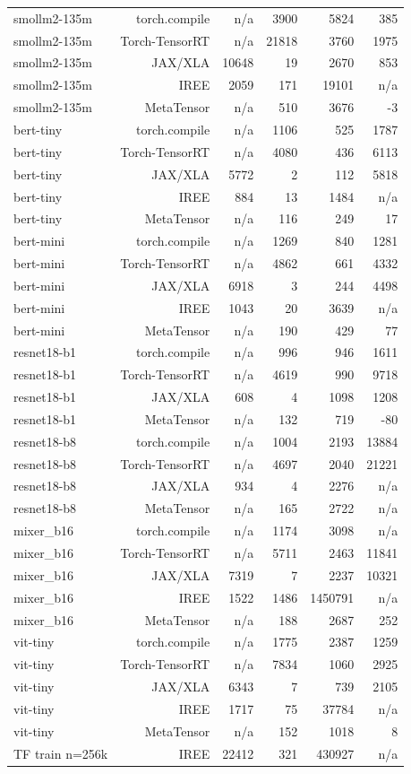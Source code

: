\begin{tabular}{lrrrrr}
smollm2-135m & torch.compile & n/a & 3900 & 5824 & 385 \\
smollm2-135m & Torch-TensorRT & n/a & 21818 & 3760 & 1975 \\
smollm2-135m & JAX/XLA & 10648 & 19 & 2670 & 853 \\
smollm2-135m & IREE & 2059 & 171 & 19101 & n/a \\
smollm2-135m & MetaTensor & n/a & 510 & 3676 & -3 \\
bert-tiny & torch.compile & n/a & 1106 & 525 & 1787 \\
bert-tiny & Torch-TensorRT & n/a & 4080 & 436 & 6113 \\
bert-tiny & JAX/XLA & 5772 & 2 & 112 & 5818 \\
bert-tiny & IREE & 884 & 13 & 1484 & n/a \\
bert-tiny & MetaTensor & n/a & 116 & 249 & 17 \\
bert-mini & torch.compile & n/a & 1269 & 840 & 1281 \\
bert-mini & Torch-TensorRT & n/a & 4862 & 661 & 4332 \\
bert-mini & JAX/XLA & 6918 & 3 & 244 & 4498 \\
bert-mini & IREE & 1043 & 20 & 3639 & n/a \\
bert-mini & MetaTensor & n/a & 190 & 429 & 77 \\
resnet18-b1 & torch.compile & n/a & 996 & 946 & 1611 \\
resnet18-b1 & Torch-TensorRT & n/a & 4619 & 990 & 9718 \\
resnet18-b1 & JAX/XLA & 608 & 4 & 1098 & 1208 \\
resnet18-b1 & MetaTensor & n/a & 132 & 719 & -80 \\
resnet18-b8 & torch.compile & n/a & 1004 & 2193 & 13884 \\
resnet18-b8 & Torch-TensorRT & n/a & 4697 & 2040 & 21221 \\
resnet18-b8 & JAX/XLA & 934 & 4 & 2276 & n/a \\
resnet18-b8 & MetaTensor & n/a & 165 & 2722 & n/a \\
mixer\_b16 & torch.compile & n/a & 1174 & 3098 & n/a \\
mixer\_b16 & Torch-TensorRT & n/a & 5711 & 2463 & 11841 \\
mixer\_b16 & JAX/XLA & 7319 & 7 & 2237 & 10321 \\
mixer\_b16 & IREE & 1522 & 1486 & 1450791 & n/a \\
mixer\_b16 & MetaTensor & n/a & 188 & 2687 & 252 \\
vit-tiny & torch.compile & n/a & 1775 & 2387 & 1259 \\
vit-tiny & Torch-TensorRT & n/a & 7834 & 1060 & 2925 \\
vit-tiny & JAX/XLA & 6343 & 7 & 739 & 2105 \\
vit-tiny & IREE & 1717 & 75 & 37784 & n/a \\
vit-tiny & MetaTensor & n/a & 152 & 1018 & 8 \\
TF train n=256k & IREE & 22412 & 321 & 430927 & n/a \\
\bottomrule
\end{tabular}
